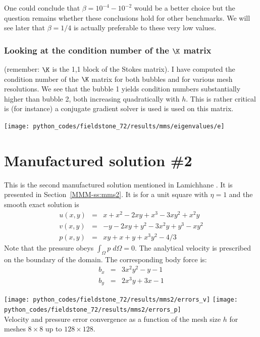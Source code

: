 One could conclude that $\beta=10^{-4}-10^{-2}$ 
would be a better choice but the question remains whether these
conclusions hold for other benchmarks. We will see later 
that $\beta=1/4$ is actually preferable to these very low values.


\subsubsection{Looking at the condition number of the $\K$ matrix} 
(remember: $\K$ is the 1,1 block of the
Stokes matrix). 
I have computed the condition number of the $\K$ matrix for both bubbles and for various mesh resolutions. 
We see that the bubble 1 yields condition numbers substantially higher than bubble 2, both increasing 
quadratically with $h$. This is rather critical is (for instance) a conjugate gradient solver is used 
is used on this matrix.

\begin{center}
\texttt{[image: python\_codes/fieldstone\_72/results/mms/eigenvalues/e]}
\end{center}

\section*{Manufactured solution \#2}

This is the second manufactured solution 
mentioned in Lamichhane \cite{lami17}. It is presented in Section~\ref{MMM-ss:mms2}.
It is for a unit square with $\eta=1$ and the smooth exact solution is
\begin{eqnarray}
u(x,y) &=& x+x^2 - 2xy+x^3 - 3xy^2 + x^2y \\
v(x,y) &=& -y-2xy+y^2 -3x^2y + y^3 - xy^2 \\
p(x,y) &=& xy+x+y+x^3y^2 - 4/3
\end{eqnarray}
Note that the pressure obeys $\int_{\Omega} p \; d\Omega = 0$. The analytical 
velocity is prescribed on the boundary of the domain. 
The corresponding body force is:
\begin{eqnarray}
b_x &=& 3x^2y^2 -y-1   \\
b_y &=& 2x^3y+3x-1 
\end{eqnarray}


\begin{center}
\texttt{[image: python\_codes/fieldstone\_72/results/mms2/errors\_v]}
\texttt{[image: python\_codes/fieldstone\_72/results/mms2/errors\_p]}\\
{\captionfont Velocity and pressure error convergence as a function of the mesh size $h$ for
meshes $8\times 8$ up to $128\times 128$.}
\end{center}


